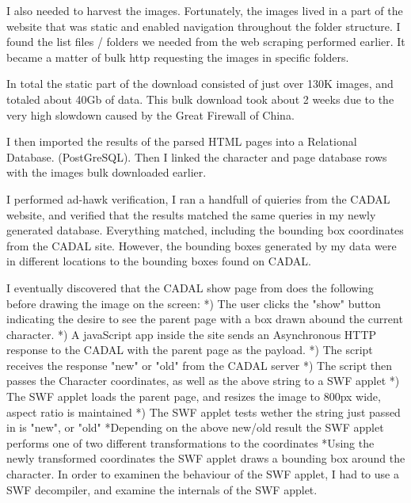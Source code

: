             I also needed to harvest the images.  Fortunately, the images lived in a part of the website that was static and enabled navigation throughout the folder structure.  I found the list files / folders we needed from the web scraping performed earlier.  It became a matter of bulk http requesting the images in specific folders.
            
            In total the static part of the download consisted of just over 130K images, and totaled about 40Gb of data.  This bulk download took about 2 weeks due to the very high slowdown caused by the Great Firewall of China.
            
            I then imported the results of the parsed HTML pages into a Relational Database. (PostGreSQL).  Then I linked the character and page database rows with the images bulk downloaded earlier.
            
            I performed ad-hawk verification, I ran a handfull of quieries from the CADAL website, and verified that the results matched the same queries in my newly generated database.   Everything matched, including the bounding box coordinates from the CADAL site.  However, the bounding boxes generated by my data were in different locations to the bounding boxes found on CADAL.
            
            
            I eventually discovered that the CADAL show page from does the following before drawing the image on the screen:
                *) The user clicks the "show" button indicating the desire to see the parent page with a box drawn abound the current character.
                *) A javaScript app inside the site sends an Asynchronous HTTP response to the CADAL with the parent page as the payload.
                *) The script receives the response "new" or "old" from the CADAL server
                *) The script then passes the Character coordinates, as well as the above string to a SWF applet
                *) The SWF applet loads the parent page, and resizes the image to 800px wide, aspect ratio is maintained
                *) The SWF applet tests wether the string just passed in is "new", or "old"
                    *Depending on the above new/old result the SWF applet performs one of two different transformations to the coordinates
                    *Using the newly transformed coordinates the SWF applet draws a bounding box around the character.
                In order to examinen the behaviour of the SWF applet, I had to use a SWF decompiler, and examine the internals of the SWF applet.
            
